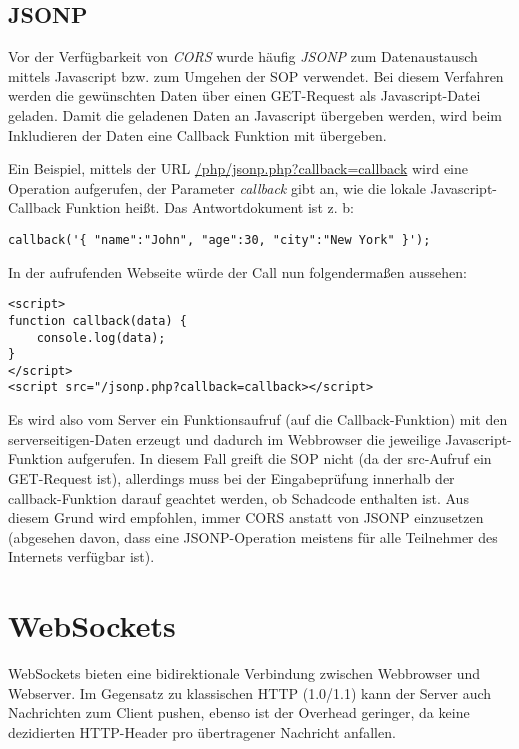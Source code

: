 \subsection{JSONP}

Vor der Verfügbarkeit von \textit{CORS} wurde häufig \textit{JSONP} zum Datenaustausch mittels Javascript bzw. zum Umgehen der SOP verwendet. Bei diesem Verfahren werden die gewünschten Daten über einen GET-Request als Javascript-Datei geladen. Damit die geladenen Daten an Javascript übergeben werden, wird beim Inkludieren der Daten eine Callback Funktion mit übergeben.

Ein Beispiel, mittels der URL \url{/php/jsonp.php?callback=callback} wird eine Operation aufgerufen, der Parameter \textit{callback} gibt an, wie die lokale Javascript-Callback Funktion heißt. Das Antwortdokument ist z. b:

\begin{verbatim}
callback('{ "name":"John", "age":30, "city":"New York" }');
\end{verbatim}

In der aufrufenden Webseite würde der Call nun folgendermaßen aussehen:

\begin{verbatim}
<script>
function callback(data) {
	console.log(data);
}
</script>
<script src="/jsonp.php?callback=callback></script>
\end{verbatim}

Es wird also vom Server ein Funktionsaufruf (auf die Callback-Funktion) mit den serverseitigen-Daten erzeugt und dadurch im Webbrowser die jeweilige Javascript-Funktion aufgerufen. In diesem Fall greift die SOP nicht (da der src-Aufruf ein GET-Request ist), allerdings muss bei der Eingabeprüfung innerhalb der callback-Funktion darauf geachtet werden, ob Schadcode enthalten ist. Aus diesem Grund wird empfohlen, immer CORS anstatt von JSONP einzusetzen (abgesehen davon, dass eine JSONP-Operation meistens für alle Teilnehmer des Internets verfügbar ist).

\section{WebSockets} 

WebSockets bieten eine bidirektionale Verbindung zwischen Webbrowser und Webserver. Im Gegensatz zu klassischen HTTP (1.0/1.1) kann der Server auch Nachrichten zum Client pushen, ebenso ist der Overhead geringer, da keine dezidierten HTTP-Header pro übertragener Nachricht anfallen.

